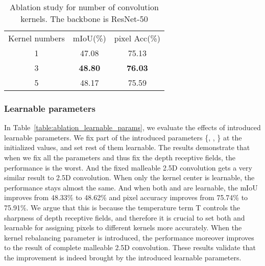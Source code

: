 \documentclass[runningheads]{llncs}
\begin{document}
\begin{table}[htbp]
  \begin{center}
  \caption{
  Ablation study for number of convolution kernels.
  The backbone is ResNet-50
  }
  \label{table:ablation_kernel_nums}
  \setlength{\tabcolsep}{7pt}
  \begin{tabular}{ccc}
    \hline\noalign{\smallskip}
    Kernel numbers & mIoU(\%) & pixel Acc(\%)\\
    \noalign{\smallskip}
    \hline
    \noalign{\smallskip}
    1 & 47.08 & 75.13 \\
    3 & \textbf{48.80} & \textbf{76.03} \\
    5 & 48.17 & 75.59 \\
    \hline
  \end{tabular}
  \end{center}
\end{table}

\subsubsection{Learnable parameters}
In Table~\ref{table:ablation_learnable_params}, we evaluate the effects of introduced learnable parameters.
We fix part of the introduced parameters \{, , \} at the initialized values, and set rest of them learnable.
The results demonstrate that when we fix all the parameters and thus fix the depth receptive fields, the performance is the worst.
And the fixed malleable 2.5D convolution gets a very similar result to 2.5D convolution.
When only the kernel center  is learnable, the performance stays almost the same.
And when both  and  are learnable, the mIoU improves from 48.33\% to 48.62\% and pixel accuracy improves from 75.74\% to 75.91\%.
We argue that this is because the temperature term T controls the sharpness of depth receptive fields, and therefore it is crucial to set both  and  learnable for assigning pixels to different kernels more accurately.
When the kernel rebalancing parameter  is introduced, the performance moreover improves to the result of complete malleable 2.5D convolution.
These results validate that the improvement is indeed brought by the introduced learnable parameters.
\end{document}
